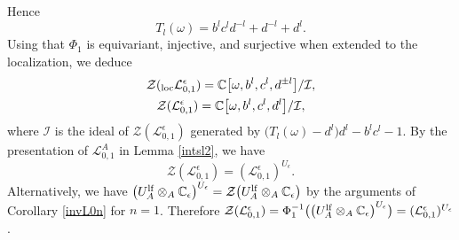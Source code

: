 \documentclass[pdftex]{sigma}%
\numberwithin{equation}{section}
\numberwithin{figure}{section}
\newcommand{\mc}{\mathbb{C}}
\newcommand{\Ll}{{\mathcal L}}
\begin{document}
Hence
\begin{equation}\label{Tcheb0}
T_l(\omega) = b^lc^ld^{-l} + d^{-l}+d^l.
\end{equation}
Using that $\Phi_1$ is equivariant, injective, and surjective when extended to the localization, we deduce
\begin{gather*}
\mathcal{Z}({}_{\rm loc}\Ll_{0,1}^\epsilon) = \mc\big[\omega,b^l,c^l,d^{\pm l}\big]/\mathcal{I},
\\
\mathcal{Z}(\Ll_{0,1}^\epsilon) = \mc\big[\omega,b^l,c^l,d^{l}\big]/\mathcal{I},
\end{gather*}
where $\mathcal{I}$ is the ideal of $\mathcal{Z}(\Ll_{0,1}^\epsilon)$ generated by $\big(T_l(\omega) - d^l\big)d^l - b^lc^l - 1$. By the presentation of $\Ll_{0,1}^A$ in Lemma \ref{intsl2}, we have
\[
\mathcal{Z}(\Ll_{0,1}^\epsilon) = (\Ll_{0,1}^\epsilon)^{U_\epsilon}.
\]
Alternatively, we have $\big(U_A^{\rm lf}\otimes_A {\mathbb C}_{\epsilon}\big)^{U_\epsilon} = \mathcal{Z}\big(U_A^{\rm lf}\otimes_A {\mathbb C}_{\epsilon}\big)$ by the arguments of Corollary \ref{invL0n} for $n=1$. Therefore $\mathcal{Z}(\Ll_{0,1}^\epsilon) = \Phi_1^{-1}\big(\big(U_A^{\rm lf}\otimes_A {\mathbb C}_{\epsilon}\big)^{U_\epsilon}\big) = (\Ll_{0,1}^\epsilon)^{U_\epsilon}$.
\end{document}
